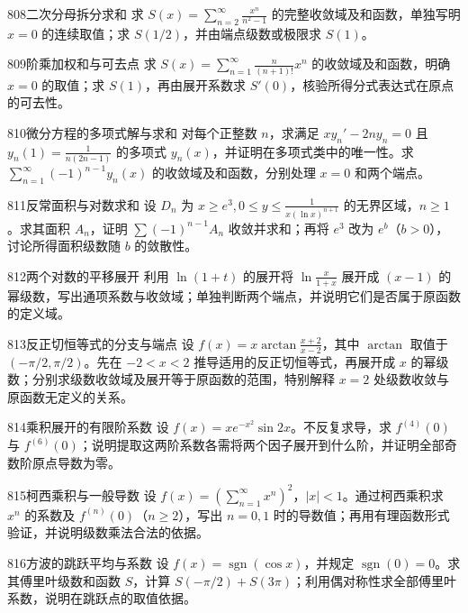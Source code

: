 \begin{exercise}{808}{二次分母拆分求和}
求 $S(x)=\sum_{n=2}^{\infty}\frac{x^n}{n^2-1}$ 的完整收敛域及和函数，单独写明 $x=0$ 的连续取值；求 $S(1/2)$，并由端点级数或极限求 $S(1)$。
\end{exercise}
\begin{exercise}{809}{阶乘加权和与可去点}
求 $S(x)=\sum_{n=1}^{\infty}\frac n{(n+1)!}x^n$ 的收敛域及和函数，明确 $x=0$ 的取值；求 $S(1)$，再由展开系数求 $S'(0)$，核验所得分式表达式在原点的可去性。
\end{exercise}
\begin{exercise}{810}{微分方程的多项式解与求和}
对每个正整数 $n$，求满足 $xy_n'-2ny_n=0$ 且 $y_n(1)=\frac1{n(2n-1)}$ 的多项式 $y_n(x)$，并证明在多项式类中的唯一性。求 $\sum_{n=1}^{\infty}(-1)^{n-1}y_n(x)$ 的收敛域及和函数，分别处理 $x=0$ 和两个端点。
\end{exercise}
\begin{exercise}{811}{反常面积与对数求和}
设 $D_n$ 为 $x\ge e^3,0\le y\le\frac1{x(\ln x)^{n+1}}$ 的无界区域，$n\ge1$。求其面积 $A_n$，证明 $\sum(-1)^{n-1}A_n$ 收敛并求和；再将 $e^3$ 改为 $e^b$（$b>0$），讨论所得面积级数随 $b$ 的敛散性。
\end{exercise}
\begin{exercise}{812}{两个对数的平移展开}
利用 $\ln(1+t)$ 的展开将 $\ln\frac{x}{1+x}$ 展开成 $(x-1)$ 的幂级数，写出通项系数与收敛域；单独判断两个端点，并说明它们是否属于原函数的定义域。
\end{exercise}
\begin{exercise}{813}{反正切恒等式的分支与端点}
设 $f(x)=x\arctan\frac{x+2}{x-2}$，其中 $\arctan$ 取值于 $(-\pi/2,\pi/2)$。先在 $-2<x<2$ 推导适用的反正切恒等式，再展开成 $x$ 的幂级数；分别求级数收敛域及展开等于原函数的范围，特别解释 $x=2$ 处级数收敛与原函数无定义的关系。
\end{exercise}
\begin{exercise}{814}{乘积展开的有限阶系数}
设 $f(x)=xe^{-x^2}\sin2x$。不反复求导，求 $f^{(4)}(0)$ 与 $f^{(6)}(0)$；说明提取这两阶系数各需将两个因子展开到什么阶，并证明全部奇数阶原点导数为零。
\end{exercise}
\begin{exercise}{815}{柯西乘积与一般导数}
设 $f(x)=(\sum_{n=1}^{\infty}x^n)^2$，$|x|<1$。通过柯西乘积求 $x^n$ 的系数及 $f^{(n)}(0)$（$n\ge2$），写出 $n=0,1$ 时的导数值；再用有理函数形式验证，并说明级数乘法合法的依据。
\end{exercise}
\begin{exercise}{816}{方波的跳跃平均与系数}
设 $f(x)=\operatorname{sgn}(\cos x)$，并规定 $\operatorname{sgn}(0)=0$。求其傅里叶级数和函数 $S$，计算 $S(-\pi/2)+S(3\pi)$；利用偶对称性求全部傅里叶系数，说明在跳跃点的取值依据。
\end{exercise}

